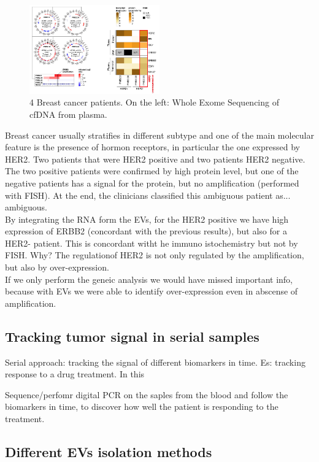 \begin{figure}[H]
    \centering
    \includegraphics[width=0.5\textwidth]{cancer2.png}
    \caption{4 Breast cancer patients. On the left:  Whole Exome Sequencing of cfDNA from plasma. }
    \label{fig:cancer2}
\end{figure}

Breast cancer usually stratifies in different subtype and one of the main molecular feature is the presence of hormon receptors, in particular the one expressed by HER2.
Two patients that were HER2 positive and two patients HER2 negative. The two positive patients were confirmed by high protein level, but one of the negative patients has a signal for the protein, but no amplification (performed with FISH). At the end, the clinicians classified this ambiguous patient as... ambiguous.
\\
By integrating the RNA form the EVs, for the HER2 positive we have high expression of ERBB2 (concordant with the previous results), but also for a HER2- patient. This is concordant witht he immuno istochemistry but not by FISH. Why? The regulationof HER2 is not only regulated by the amplification, but also by over-expression.
\\
If we only perform the geneic analysis we would have missed important info, because with EVs we were able to identify over-expression even in abscense of amplification. 

\subsection{Tracking tumor signal in serial samples}
Serial approach: tracking the signal of different biomarkers in time. Es: tracking response to a drug treatment. In this 

Sequence/perfomr digital PCR on the saples from the blood and follow the biomarkers in time, to discover how well the patient is responding to the treatment. 

\subsection{Different EVs isolation methods}